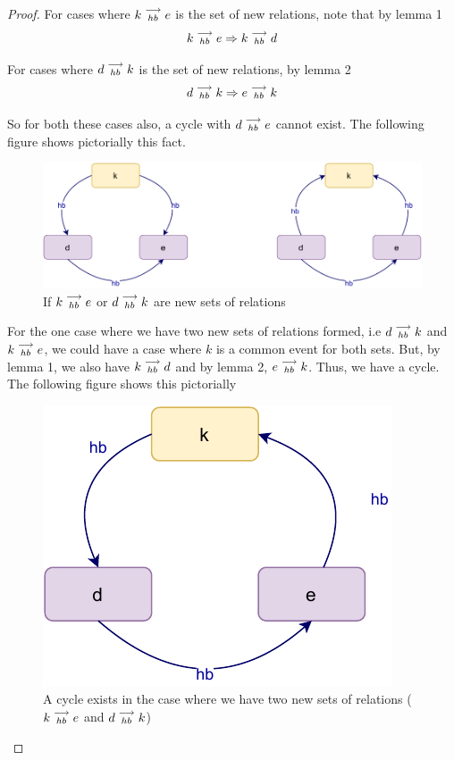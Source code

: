 \begin{proof}
        For cases where $k\stackrel{\longrightarrow}{_{hb}}e$ is the set of new relations, note that by lemma 1
        \[
            k\stackrel{\longrightarrow}{_{hb}}e \Rightarrow k\stackrel{\longrightarrow}{_{hb}}d
        \]
        
        For cases where $d\stackrel{\longrightarrow}{_{hb}}k$ is the set of new relations, by lemma 2
        \[
            d\stackrel{\longrightarrow}{_{hb}}k \Rightarrow e\stackrel{\longrightarrow}{_{hb}}k
        \]
        
        So for both these cases also, a cycle with $d\stackrel{\longrightarrow}{_{hb}}e$ cannot exist. The following figure shows pictorially this fact. 
        \begin{figure}[H]
            \centering
            \includegraphics[scale=0.7]{Q4(a)_2.pdf}
            \caption{If $k\stackrel{\longrightarrow}{_{hb}}e$ or $d\stackrel{\longrightarrow}{_{hb}}k$ are new sets of relations}
            \label{fig:my_label}
        \end{figure}
        
        
        For the one case where we have two new sets of relations formed, i.e $d\stackrel{\longrightarrow}{_{hb}}k$ and $k\stackrel{\longrightarrow}{_{hb}}e$, we could have a case where $k$ is a common event for both sets. But, by lemma 1, we also have $k\stackrel{\longrightarrow}{_{hb}}d$ and by lemma 2, $e\stackrel{\longrightarrow}{_{hb}}k$. Thus, we have a cycle. The following figure shows this pictorially
        
        \begin{figure}[H]
            \centering
            \includegraphics[scale=0.7]{Q4(a)_3.pdf}
            \caption{A cycle exists in the case where we have two new sets of relations ($k\stackrel{\longrightarrow}{_{hb}}e$ and $d\stackrel{\longrightarrow}{_{hb}}k$) }
            \label{fig:my_label}
        \end{figure}
        

\end{proof}
